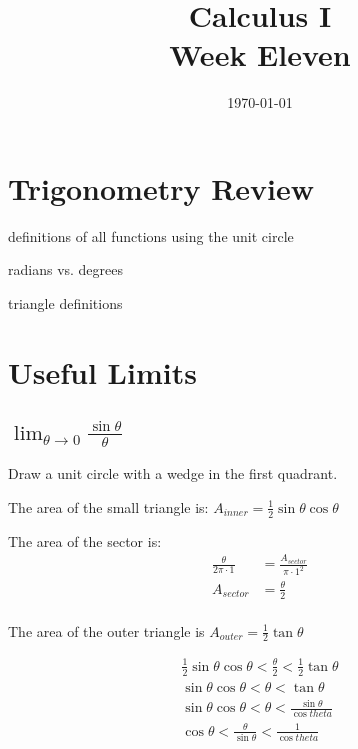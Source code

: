 \documentclass[letterpaper, landscape]{exam}
\author{}
\date{\today}
\title{Calculus I \\ Week Eleven}
\begin{document}
  \maketitle
  \tableofcontents

  \section{Trigonometry Review} %
  
  \begin{itemize*}
    \item definitions of all functions using the unit circle
    \item radians vs. degrees
    \item triangle definitions
  \end{itemize*}

  \section{Useful Limits} %
  
  \subsection{$\lim_{\theta \to 0} \frac{\sin \theta}{\theta}$} %
  
  Draw a unit circle with a wedge in the first quadrant. 

  The area of the small triangle is: $A_{inner} = \frac{1}{2} \sin
    \theta \cos \theta$

  The area of the sector is:
    \begin{align*}
      \frac{\theta}{2 \pi \cdot 1} &= \frac{A_{sector}}{\pi \cdot 1^2} \\
      A_{sector} &= \frac{\theta}{2} \\
    \end{align*}

  The area of the outer triangle is $A_{outer} = \frac{1}{2} \tan \theta$

  \begin{align*}
    \frac{1}{2} \sin \theta \cos \theta < \frac{\theta}{2} < \frac{1}{2} \tan \theta \\
    \sin \theta \cos \theta < \theta < \tan \theta \\
    \sin \theta \cos \theta < \theta < \frac{\sin \theta}{\cos theta} \\
    \cos \theta < \frac{\theta}{\sin \theta} < \frac{1}{\cos theta} \\
  \end{align*}
\end{document}
